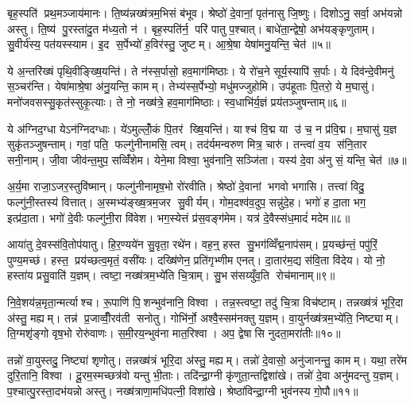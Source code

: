 बृह॒स्पति॑ प्रथ॒मञ्जाय॑मानः। ति॒ष्य॑न्नख्ष॑त्रम॒भिसं ब॑भूव। श्रेष्ठो॑ दे॒वानां॒ पृत॑नासु जि॒ष्णुः। दिशोऽनु॒ सर्वा॒ अभ॑यन्नो अस्तु। ति॒ष्य॑ पु॒रस्ता॑दु॒त म॑ध्य॒तो न॑। बृह॒स्पति॑र्न॒ परि॑ पातु प॒श्चात्। बाधे॑ता॒न्द्वेषो॒ अभ॑यङ्कृणुताम्। सु॒वीर्य॑स्य॒ पत॑यस्स्याम। इ॒द स॒र्पेभ्यो॑ ह॒विर॑स्तु॒ जुष्टम्। आ॒श्रे॒षा येषा॑मनु॒यन्ति॒ चेत॑॥५॥

ये अ॒न्तरि॑ख्षं पृथि॒वीङ्ख्षि॒यन्ति॑। ते न॑स्स॒र्पासो॒ हव॒माग॑मिष्ठाः। ये रो॑च॒ने सूर्य॒स्यापि॑ स॒र्पाः। ये दिव॑न्दे॒वीमनु॑ स॒ञ्चर॑न्ति। येषा॑माश्रे॒षा अ॑नु॒यन्ति॒ कामम्। तेभ्य॑स्स॒र्पेभ्यो॒ मधु॑मज्जुहोमि। उप॑हूताः पि॒तरो॒ ये म॒घासु॑। मनो॑जवसस्सु॒कृत॑स्सुकृ॒त्याः। ते नो॒ नख्ष॑त्रे॒ हव॒माग॑मिष्ठाः। स्व॒धाभि॑र्य॒ज्ञं प्रय॑तञ्जुषन्ताम्॥६॥

ये अ॑ग्निद॒ग्धा येऽन॑ग्निदग्धाः। ये॑ऽमुल्लोँ॒कं पि॒तर॑ ख्षि॒यन्ति॑। याश्च॑ वि॒द्म या उ॑ च॒ न प्र॑वि॒द्म। म॒घासु॑ य॒ज्ञ सुकृ॑तञ्जुषन्ताम्। गवां॒ पति॒ फल्गु॑नीनामसि॒ त्वम्। तद॑र्यमन्वरुण मित्र॒ चारु॑। तन्त्वा॑ व॒य स॑नि॒तार सनी॒नाम्। जी॒वा जीव॑न्त॒मुप॒ सव्विँ॑शेम। येने॒मा विश्वा॒ भुव॑नानि॒ सञ्जि॑ता। यस्य॑ दे॒वा अ॑नु सं॒ यन्ति॒ चेत॑॥७॥

अ॒र्य॒मा राजा॒ऽजर॒स्तुवि॑ष्मान्। फल्गु॑नीनामृष॒भो रो॑रवीति। श्रेष्ठो॑ दे॒वानां भगवो भगासि। तत्त्वा॑ विदु॒ फल्गु॑नी॒स्तस्य॑ वित्तात्। अ॒स्मभ्य॑ङ्ख्ष॒त्रम॒जर सु॒वीर्यम्। गोम॒दश्व॑व॒दुप॒ सन्नु॑दे॒ह। भगो॑ ह दा॒ता भग॒ इत्प्र॑दा॒ता। भगो॑ दे॒वीः फल्गु॑नी॒रा वि॑वेश। भग॒स्येत्तं प्र॑स॒वङ्ग॑मेम। यत्र॑ दे॒वैस्स॑ध॒मादं॑ मदेम॥८॥

आया॑तु दे॒वस्स॑वि॒तोप॑यातु। हि॒र॒ण्यये॑न सु॒वृता॒ रथे॑न। वह॒न्॒ हस्त सु॒भग॑व्विँद्म॒नाप॑सम्। प्र॒यच्छ॑न्तं॒ पपु॑रिं॒ पुण्य॒मच्छ॑। हस्त॒ प्रय॑च्छत्व॒मृतं॒ वसी॑यः। दख्षि॑णेन॒ प्रति॑गृभ्णीम एनत्। दा॒तार॑म॒द्य स॑वि॒ता वि॑देय। यो नो॒ हस्ता॑य प्रसु॒वाति॑ य॒ज्ञम्। त्वष्टा॒ नख्ष॑त्रम॒भ्ये॑ति चि॒त्राम्। सु॒भस॑सय्युँव॒ति रोच॑मानाम्॥९॥

नि॒वे॒शय॑न्न॒मृता॒न्मर्त्याश्च। रू॒पाणि॑ पि॒शन्भुव॑नानि॒ विश्वा। तन्न॒स्त्वष्टा॒ तदु॑ चि॒त्रा विच॑ष्टाम्। तन्नख्ष॑त्रं भूरि॒दा अ॑स्तु॒ मह्यम्। तन्न॑ प्र॒जाव्वीँ॒रव॑ती सनोतु। गोभि॑र्नो॒ अश्वै॒स्सम॑नक्तु य॒ज्ञम्। वा॒युर्नख्ष॑त्रम॒भ्ये॑ति॒ निष्ट्याम्। ति॒ग्मशृ॑ङ्गो वृष॒भो रोरु॑वाणः। स॒मी॒रय॒न्भुव॑ना मात॒रिश्वा। अप॒ द्वेषासि नुदता॒मरा॑तीः॥१०॥

तन्नो॑ वा॒युस्तदु॒ निष्ट्या॑ शृणोतु। तन्नख्ष॑त्रं भूरि॒दा अ॑स्तु॒ मह्यम्। तन्नो॑ दे॒वासो॒ अनु॑जानन्तु॒ कामम्। यथा॒ तरे॑म दुरि॒तानि॒ विश्वा। दू॒रम॒स्मच्छत्र॑वो यन्तु भी॒ताः। तदि॑न्द्रा॒ग्नी कृ॑णुता॒न्तद्विशा॑खे। तन्नो॑ दे॒वा अनु॑मदन्तु य॒ज्ञम्। प॒श्चात्पु॒रस्ता॒दभ॑यन्नो अस्तु। नख्ष॑त्राणा॒मधि॑पत्नी॒ विशा॑खे। श्रेष्ठा॑विन्द्रा॒ग्नी भुव॑नस्य गो॒पौ॥११॥

